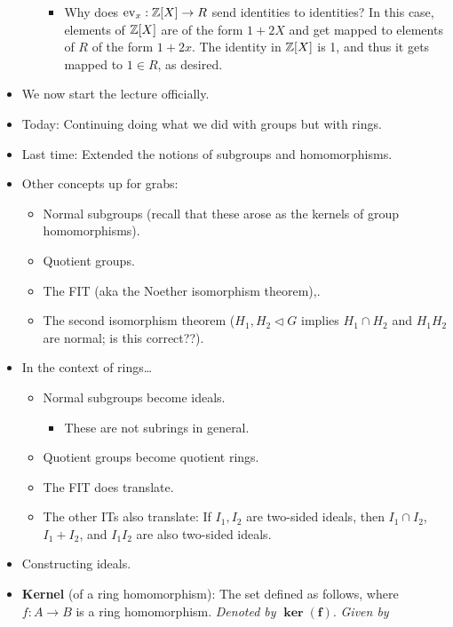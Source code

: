 \documentclass[../notes.tex]{subfiles}
\begin{document}
\begin{itemize}
\begin{itemize}
        \begin{itemize}
            \item Why does $\operatorname{ev}_x:\mathbb{Z}[X]\to R$ send identities to identities? In this case, elements of $\mathbb{Z}[X]$ are of the form $1+2X$ and get mapped to elements of $R$ of the form $1+2x$. The identity in $\mathbb{Z}[X]$ is 1, and thus it gets mapped to $1\in R$, as desired.
        \end{itemize}
    \end{itemize}
    \item We now start the lecture officially.
    \item Today: Continuing doing what we did with groups but with rings.
    \item Last time: Extended the notions of subgroups and homomorphisms.
    \item Other concepts up for grabs:
    \begin{itemize}
        \item Normal subgroups (recall that these arose as the kernels of group homomorphisms).
        \item Quotient groups.
        \item The FIT (aka the Noether isomorphism theorem),.
        \item The second isomorphism theorem ($H_1,H_2\triangleleft G$ implies $H_1\cap H_2$ and $H_1H_2$ are normal; is this correct??).
    \end{itemize}
    \item In the context of rings\dots
    \begin{itemize}
        \item Normal subgroups become ideals.
        \begin{itemize}
            \item These are not subrings in general.
        \end{itemize}
        \item Quotient groups become quotient rings.
        \item The FIT does translate.
        \item The other ITs also translate: If $I_1,I_2$ are two-sided ideals, then $I_1\cap I_2$, $I_1+I_2$, and $I_1I_2$ are also two-sided ideals.
    \end{itemize}
    \item Constructing ideals.
    \item \textbf{Kernel} (of a ring homomorphism): The set defined as follows, where $f:A\to B$ is a ring homomorphism. \emph{Denoted by} $\bm{\ker(f)}$. \emph{Given by}

\end{itemize}
\end{document}
